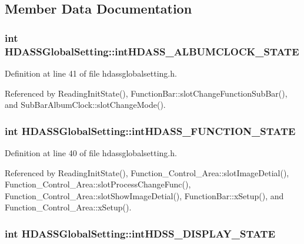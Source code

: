 \subsection{Member Data Documentation}
\subsubsection{\setlength{\rightskip}{0pt plus 5cm}int {\bf HDASSGlobal\-Setting::int\-HDASS\_\-ALBUMCLOCK\_\-STATE}}\label{classHDASSGlobalSetting_HDASSGlobalSettingo1}




Definition at line 41 of file hdassglobalsetting.h.

Referenced by Reading\-Init\-State(), Function\-Bar::slot\-Change\-Function\-Sub\-Bar(), and Sub\-Bar\-Album\-Clock::slot\-Change\-Mode().
\subsubsection{\setlength{\rightskip}{0pt plus 5cm}int {\bf HDASSGlobal\-Setting::int\-HDASS\_\-FUNCTION\_\-STATE}}\label{classHDASSGlobalSetting_HDASSGlobalSettingo0}




Definition at line 40 of file hdassglobalsetting.h.

Referenced by Reading\-Init\-State(), Function\_\-Control\_\-Area::slot\-Image\-Detial(), Function\_\-Control\_\-Area::slot\-Process\-Change\-Func(), Function\_\-Control\_\-Area::slot\-Show\-Image\-Detial(), Function\-Bar::x\-Setup(), and Function\_\-Control\_\-Area::x\-Setup().
\subsubsection{\setlength{\rightskip}{0pt plus 5cm}int {\bf HDASSGlobal\-Setting::int\-HDSS\_\-DISPLAY\_\-STATE}}\label{classHDASSGlobalSetting_HDASSGlobalSettingo2}




